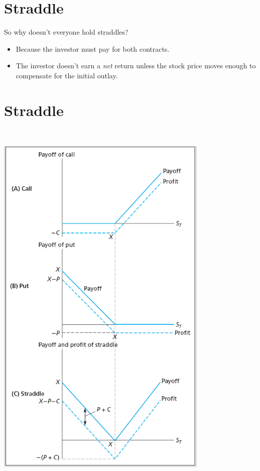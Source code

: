 \documentclass[letterpaper,10pt,english]{sphinxmanual}
\begin{document}
\section{Straddle}
\label{options:id22}
So why doesn't everyone hold straddles?
\begin{itemize}
\item {} 
Because the investor must pay for both contracts.

\end{itemize}
\begin{itemize}
\item {} 
The investor doesn't earn a \emph{net} return unless the stock price
moves enough to compensate for the initial outlay.

\end{itemize}


\section{Straddle}
\label{options:id23}
$\qquad$

\includegraphics[width=4in]{bod34698_1509_lg.jpg}
\end{document}
